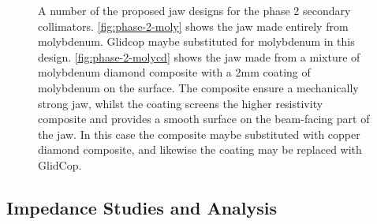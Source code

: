 \begin{figure}
\label{fig:phase-2-jaw-designs}
\caption{A number of the proposed jaw designs for the phase 2 secondary collimators. \ref{fig:phase-2-moly} shows the jaw made entirely from molybdenum. Glidcop maybe substituted for molybdenum in this design. \ref{fig:phase-2-molycd} shows the jaw made from a mixture of molybdenum diamond composite with a 2mm coating of molybdenum on the surface. The composite ensure a mechanically strong jaw, whilst the coating screens the higher resistivity composite and provides a smooth surface on the beam-facing part of the jaw. In this case the composite maybe substituted with copper diamond composite, and likewise the coating may be replaced with GlidCop.}
\end{figure}

\subsection{Impedance Studies and Analysis}

